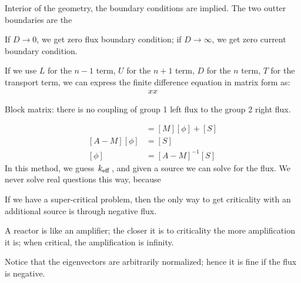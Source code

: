 \documentclass{school-22.211-notes}
\date{April  2, 2012}
\begin{document}
\maketitle







Interior of the geometry, the boundary conditions are implied. The two outter boundaries are the 


If $D \to 0$, we get zero flux boundary condition; if $D \to \infty$, we get zero current boundary condition. 

If we use $L$ for the $n-1$ term, $U$ for the $n+1$ term, $D$ for the $n$ term, $T$ for the transport term, we can express the finite difference equation in matrix form as: 
\begin{align}
xx
\end{align}

Block matrix: there is no coupling of group 1 left flux to the group 2 right flux. 

\begin{align}
[A] [\phi] &= [M] [\phi] + [S] \\
[A - M ] [\phi] &= [S] \\
[\phi] &= [A - M]^{-1} [S]
\end{align}
In this method, we guess $\left. k_{\mathrm{eff}} \right.$, and given a source we can solve for the flux. We never solve real questions this way, because 

If we have a super-critical problem, then the only way to get criticality with an additional source is through negative flux. 

A reactor is like an amplifier; the closer it is to criticality the more amplification it is; when critical, the amplification is infinity. 



Notice that the eigenvectors are arbitrarily normalized; hence it is fine if the flux is negative. 



\end{document}
